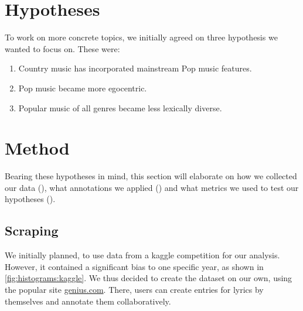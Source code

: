 \documentclass[11pt,a4paper]{article}
\begin{document}

\section{Hypotheses}\label{sec:hypotheses}

To work on more concrete topics, we initially agreed on three hypothesis we wanted to focus on. These were:

\begin{enumerate}[$H_1$]
	\item \label{hypo:country} Country music has incorporated mainstream Pop music features.
	\item \label{hypo:ego} Pop music became more egocentric. 
	\item \label{hypo:lexical} Popular music of all genres became less lexically diverse. 
	
\end{enumerate}


\section{Method}\label{sec:method}

Bearing these hypotheses in mind, this section will elaborate on how we collected our data (), what annotations we applied () and what metrics we used to test our hypotheses (). 
\subsection{Scraping}\label{sec:scraping}

We initially planned, to use data from a kaggle competition \citep{kuznetsov_55000+_2017} for our analysis. However, it contained a significant bias to one specific year, as shown in \cref{fig:histograms:kaggle}. We thus decided to create the dataset on our own, using the popular site \url{genius.com}. There, users can create entries for lyrics by themselves and annotate them collaboratively.
\end{document}
